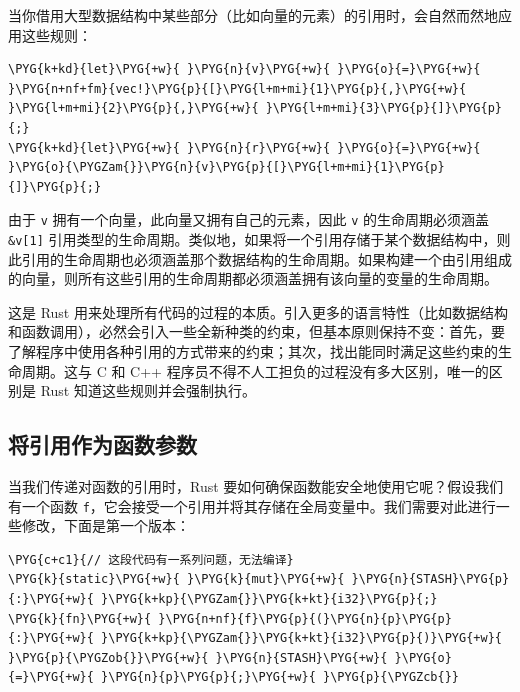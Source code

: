 
当你借用大型数据结构中某些部分（比如向量的元素）的引用时，会自然而然地应用这些规则：

\begin{Verbatim}[commandchars=\\\{\},breaklines=true,breakanywhere=true,fontsize=\codefont,xleftmargin=17bp]
\PYG{k+kd}{let}\PYG{+w}{ }\PYG{n}{v}\PYG{+w}{ }\PYG{o}{=}\PYG{+w}{ }\PYG{n+nf+fm}{vec!}\PYG{p}{[}\PYG{l+m+mi}{1}\PYG{p}{,}\PYG{+w}{ }\PYG{l+m+mi}{2}\PYG{p}{,}\PYG{+w}{ }\PYG{l+m+mi}{3}\PYG{p}{]}\PYG{p}{;}
\PYG{k+kd}{let}\PYG{+w}{ }\PYG{n}{r}\PYG{+w}{ }\PYG{o}{=}\PYG{+w}{ }\PYG{o}{\PYGZam{}}\PYG{n}{v}\PYG{p}{[}\PYG{l+m+mi}{1}\PYG{p}{]}\PYG{p}{;}
\end{Verbatim}

由于 \texttt{v} 拥有一个向量，此向量又拥有自己的元素，因此 \texttt{v} 的生命周期必须涵盖 \texttt{\&v[1]} 引用类型的生命周期。类似地，如果将一个引用存储于某个数据结构中，则此引用的生命周期也必须涵盖那个数据结构的生命周期。如果构建一个由引用组成的向量，则所有这些引用的生命周期都必须涵盖拥有该向量的变量的生命周期。

这是 Rust 用来处理所有代码的过程的本质。引入更多的语言特性（比如数据结构和函数调用），必然会引入一些全新种类的约束，但基本原则保持不变：首先，要了解程序中使用各种引用的方式带来的约束；其次，找出能同时满足这些约束的生命周期。这与 C 和 C++ 程序员不得不人工担负的过程没有多大区别，唯一的区别是 Rust 知道这些规则并会强制执行。

\subsection{将引用作为函数参数}

当我们传递对函数的引用时，Rust 要如何确保函数能安全地使用它呢？假设我们有一个函数 \texttt{f}，它会接受一个引用并将其存储在全局变量中。我们需要对此进行一些修改，下面是第一个版本：

\begin{Verbatim}[commandchars=\\\{\},breaklines=true,breakanywhere=true,fontsize=\codefont,xleftmargin=17bp]
\PYG{c+c1}{// 这段代码有一系列问题，无法编译}
\PYG{k}{static}\PYG{+w}{ }\PYG{k}{mut}\PYG{+w}{ }\PYG{n}{STASH}\PYG{p}{:}\PYG{+w}{ }\PYG{k+kp}{\PYGZam{}}\PYG{k+kt}{i32}\PYG{p}{;}
\PYG{k}{fn}\PYG{+w}{ }\PYG{n+nf}{f}\PYG{p}{(}\PYG{n}{p}\PYG{p}{:}\PYG{+w}{ }\PYG{k+kp}{\PYGZam{}}\PYG{k+kt}{i32}\PYG{p}{)}\PYG{+w}{ }\PYG{p}{\PYGZob{}}\PYG{+w}{ }\PYG{n}{STASH}\PYG{+w}{ }\PYG{o}{=}\PYG{+w}{ }\PYG{n}{p}\PYG{p}{;}\PYG{+w}{ }\PYG{p}{\PYGZcb{}}
\end{Verbatim}

